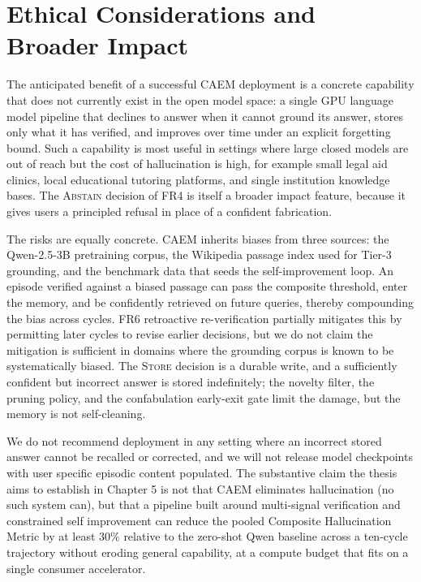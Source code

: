 \section{Ethical Considerations and Broader Impact}
\label{sec:impact}

The anticipated benefit of a successful CAEM deployment is a concrete capability that does not currently exist in the open model space: a single GPU language model pipeline that declines to answer when it cannot ground its answer, stores only what it has verified, and improves over time under an explicit forgetting bound. Such a capability is most useful in settings where large closed models are out of reach but the cost of hallucination is high, for example small legal aid clinics, local educational tutoring platforms, and single institution knowledge bases. The \textsc{Abstain} decision of FR4 is itself a broader impact feature, because it gives users a principled refusal in place of a confident fabrication.

The risks are equally concrete. CAEM inherits biases from three sources: the Qwen-2.5-3B pretraining corpus, the Wikipedia passage index used for Tier-3 grounding, and the benchmark data that seeds the self-improvement loop. An episode verified against a biased passage can pass the composite threshold, enter the memory, and be confidently retrieved on future queries, thereby compounding the bias across cycles. FR6 retroactive re-verification partially mitigates this by permitting later cycles to revise earlier decisions, but we do not claim the mitigation is sufficient in domains where the grounding corpus is known to be systematically biased. The \textsc{Store} decision is a durable write, and a sufficiently confident but incorrect answer is stored indefinitely; the novelty filter, the pruning policy, and the confabulation early-exit gate limit the damage, but the memory is not self-cleaning.

We do not recommend deployment in any setting where an incorrect stored answer cannot be recalled or corrected, and we will not release model checkpoints with user specific episodic content populated. The substantive claim the thesis aims to establish in Chapter 5 is not that CAEM eliminates hallucination (no such system can), but that a pipeline built around multi-signal verification and constrained self improvement can reduce the pooled Composite Hallucination Metric by at least $30\%$ relative to the zero-shot Qwen baseline across a ten-cycle trajectory without eroding general capability, at a compute budget that fits on a single consumer accelerator.

